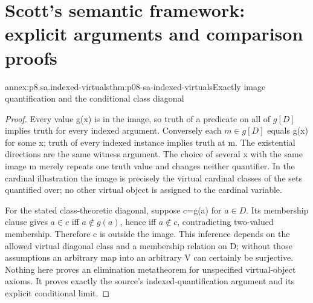\section{Scott's semantic framework: explicit arguments and comparison proofs}

\begin{annexitem}{annex:p8.sa.indexed-virtuals}{thm:p08-sa-indexed-virtuals}{Exactly image quantification and the conditional class diagonal}
\begin{proof}
Every value g(x) is in the image, so truth of a predicate on all
of \(g[D]\) implies truth for every indexed argument. Conversely
each \(m\in g[D]\) equals g(x) for some x; truth of every
indexed instance implies truth at m. The existential directions
are the same witness argument. The choice of several x with the
same image m merely repeats one truth value and changes neither
quantifier. In the cardinal illustration the image is precisely
the virtual cardinal classes of the sets quantified over; no
other virtual object is assigned to the cardinal variable.

For the stated class-theoretic diagonal, suppose c=g(a) for
\(a\in D\). Its membership clause gives
\(a\in c\) iff \(a\notin g(a)\), hence iff
\(a\notin c\), contradicting two-valued membership. Therefore
c is outside the image. This inference depends on the allowed
virtual diagonal class and a membership relation on D; without
those assumptions an arbitrary map into an arbitrary V can
certainly be surjective. Nothing here proves an elimination
metatheorem for unspecified virtual-object axioms. It proves
exactly the source's indexed-quantification argument and its
explicit conditional limit.
\end{proof}
\end{annexitem}

